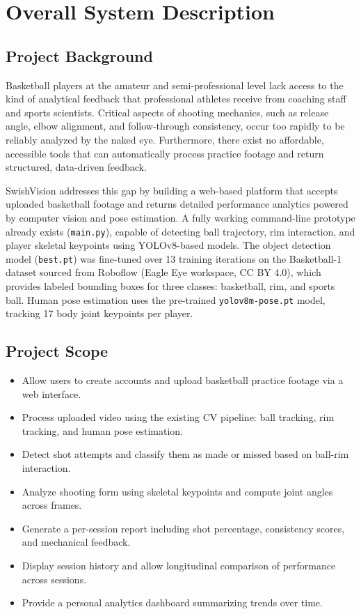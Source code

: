 ﻿\documentclass[11pt,a4paper]{article}
\begin{document}
\section{Overall System Description}

\subsection{Project Background}
Basketball players at the amateur and semi-professional level lack access to the kind of analytical feedback that professional athletes receive from coaching staff and sports scientists. Critical aspects of shooting mechanics, such as release angle, elbow alignment, and follow-through consistency, occur too rapidly to be reliably analyzed by the naked eye. Furthermore, there exist no affordable, accessible tools that can automatically process practice footage and return structured, data-driven feedback.

SwishVision addresses this gap by building a web-based platform that accepts uploaded basketball footage and returns detailed performance analytics powered by computer vision and pose estimation. A fully working command-line prototype already exists (\texttt{main.py}), capable of detecting ball trajectory, rim interaction, and player skeletal keypoints using YOLOv8-based models. The object detection model (\texttt{best.pt}) was fine-tuned over 13 training iterations on the Basketball-1 dataset sourced from Roboflow (Eagle Eye workspace, CC BY 4.0), which provides labeled bounding boxes for three classes: basketball, rim, and sports ball. Human pose estimation uses the pre-trained \texttt{yolov8m-pose.pt} model, tracking 17 body joint keypoints per player.

\subsection{Project Scope}
\begin{itemize}[leftmargin=*]
    \item Allow users to create accounts and upload basketball practice footage via a web interface.
    \item Process uploaded video using the existing CV pipeline: ball tracking, rim tracking, and human pose estimation.
    \item Detect shot attempts and classify them as made or missed based on ball-rim interaction.
    \item Analyze shooting form using skeletal keypoints and compute joint angles across frames.
    \item Generate a per-session report including shot percentage, consistency scores, and mechanical feedback.
    \item Display session history and allow longitudinal comparison of performance across sessions.
    \item Provide a personal analytics dashboard summarizing trends over time.
\end{itemize}
\end{document}
